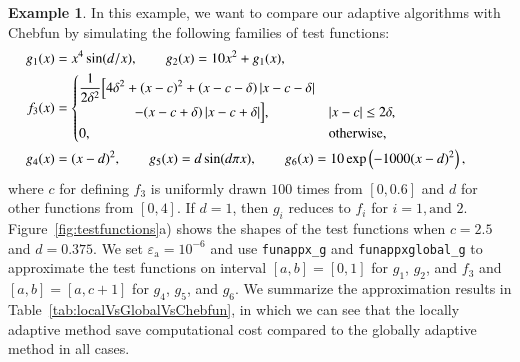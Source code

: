 \documentclass[review]{elsarticle}
\newcommand{\abstol}{\varepsilon_{\textrm{a}}}
\theoremstyle{definition}
\newtheorem{exmp}{Example}
\begin{document}

\begin{exmp}
In this example, we want to compare our adaptive algorithms with Chebfun by
simulating the following families of test functions:
%
\begin{align*}
 g_1(x) &= x^4 \sin(d/x), \qquad
 g_2(x) = 10  x^2 + g_1(x),
\\ f_3(x) &= \begin{cases} \displaystyle
   \frac{1}{2\delta^2} \Bigl [4 \delta^2 + (x-c)^2 + (x-c-\delta)\left \lvert x-c-\delta \right \rvert
\\ \qquad \qquad
    - (x-c+\delta)\left \lvert x-c+\delta \right \rvert \Bigr ], & \left \lvert x-c \right \rvert \le 2\delta,
\\ 0, & \text{otherwise},
\end{cases} \\
 g_4(x) & = (x-d)^2, \qquad
 g_5(x)= d\sin(d\pi x), \qquad
 g_6(x)= 10\exp\left(-1000(x-d)^2\right), \qquad
\end{align*}
where $c$ for defining $f_3$ is uniformly drawn $100$ times from $[0,0.6]$ and
$d$ for other functions from $[0,4]$. If $d=1$, then $g_i$ reduces to $f_i$
for $i=1, \mbox{and } 2$. Figure~\ref{fig:testfunctions}a) shows the shapes of
the test functions when $c=2.5$ and $d=0.375$. We set $\abstol = 10^{-6}$ and
use \texttt{funappx\_g} and \texttt{funappxglobal\_g} to approximate the test
functions on interval $[a,b]=[0,1]$ for $g_1$, $g_2$, and $f_3$ and
$[a,b]=[a,c+1]$ for $g_4$, $g_5$, and $g_6$. We summarize the approximation
results in Table~\ref{tab:localVsGlobalVsChebfun}, in which we can see that the
locally adaptive method save computational cost compared to the globally
adaptive method in all cases.


\end{exmp}
\end{document}
